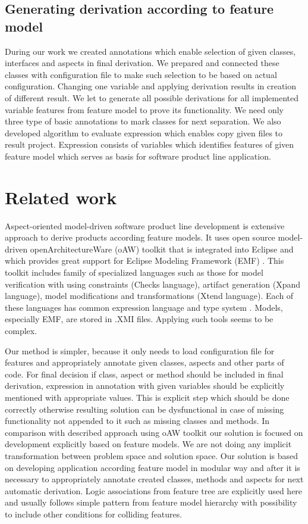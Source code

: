 \documentclass[11pt,english,a4paper,twoside]{article}
\begin{document}
\subsection{Generating derivation according to feature model} \label{gameDerivationBattleship}

During our work we created annotations which enable selection of given classes, interfaces and aspects in final derivation. We prepared and connected these classes with configuration file to make such selection to be based on actual configuration. Changing one variable and applying derivation results in creation of different result. We let to generate all possible derivations for all implemented variable features from feature model to prove its functionality. We need only three type of basic annotations to mark classes for next separation. We also developed algorithm to evaluate expression which enables copy given files to result project. Expression consists of variables which identifies features of given feature model which serves as basis for software product line application.    


\section{Related work} \label{recentWork}

Aspect-oriented model-driven software product line development is extensive approach to derive products according feature models. It uses open source model-driven openArchitectureWare (oAW) toolkit that is integrated into Eclipse and which provides great support for Eclipse Modeling Framework (EMF) \cite{voelter_product_2007}. This toolkit includes family of specialized languages such as those for model verification with using constraints (Checks language), artifact generation (Xpand language), model modifications and transformations (Xtend language). Each of these languages has common expression language and type system \cite{voelter_product_2007}. Models, especially EMF, are stored in .XMI files. Applying such tools seems to be complex. 

Our method is simpler, because it only needs to load configuration file for features and appropriately annotate given classes, aspects and other parts of code. For final decision if class, aspect or method should be included in final derivation, expression in annotation with given variables should be explicitly mentioned with appropriate values. This is explicit step which should be done correctly otherwise resulting solution can be dysfunctional in case of missing functionality not appended to it such as missing classes and methods. In comparison with described approach using oAW toolkit our solution is focused on development explicitly based on feature models. We are not doing any implicit transformation between problem space and solution space. Our solution is based on developing application according feature model in modular way and after it is necessary to appropriately annotate created classes, methods and aspects for next automatic derivation. Logic associations from feature tree are explicitly used here and usually follows simple pattern from feature model hierarchy with possibility to include other conditions for colliding features.  
\end{document}

